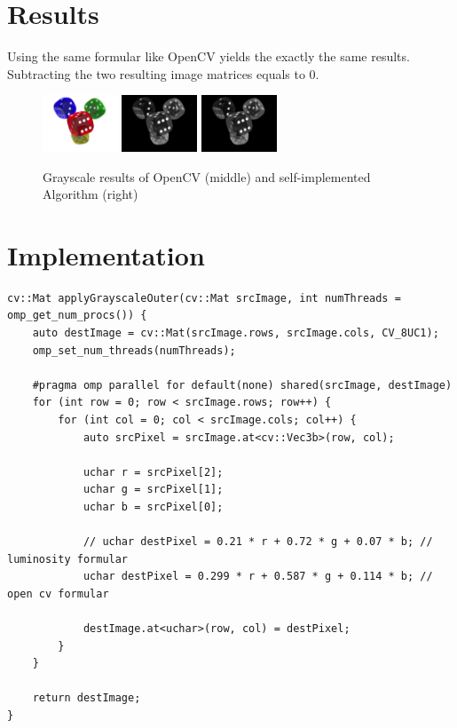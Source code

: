 \section{Results}

Using the same formular like OpenCV yields the exactly the same results. Subtracting the two resulting image matrices equals to $ 0 $.

\begin{figure}[H]
    \centering

    \includegraphics[width=0.20\textwidth]{images/dice.png}
    \includegraphics[width=0.20\textwidth]{images/cv-grayscale.png}
    \includegraphics[width=0.20\textwidth]{images/own-grayscale.png}
    
    \caption{Grayscale results of OpenCV (middle) and self-implemented  Algorithm (right)}
    \label{fig:grayscale}
\end{figure}

\section{Implementation}


\begin{listing}[H]
    \begin{verbatim}
cv::Mat applyGrayscaleOuter(cv::Mat srcImage, int numThreads = omp_get_num_procs()) {
    auto destImage = cv::Mat(srcImage.rows, srcImage.cols, CV_8UC1);
    omp_set_num_threads(numThreads);

    #pragma omp parallel for default(none) shared(srcImage, destImage)
    for (int row = 0; row < srcImage.rows; row++) {
        for (int col = 0; col < srcImage.cols; col++) {
            auto srcPixel = srcImage.at<cv::Vec3b>(row, col);

            uchar r = srcPixel[2];
            uchar g = srcPixel[1];
            uchar b = srcPixel[0];

            // uchar destPixel = 0.21 * r + 0.72 * g + 0.07 * b; // luminosity formular
            uchar destPixel = 0.299 * r + 0.587 * g + 0.114 * b; // open cv formular

            destImage.at<uchar>(row, col) = destPixel;
        }
    }

    return destImage;
}
    \end{verbatim}
    \label{listing:grayscale}
\end{listing}


